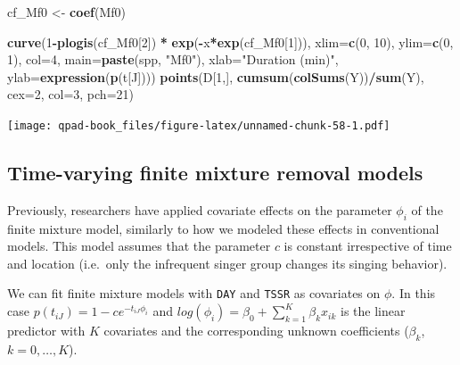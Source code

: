\documentclass[12pt,]{book}
\newenvironment{Shaded}{\begin{snugshade}}{\end{snugshade}}
\newcommand{\DataTypeTok}[1]{\textcolor[rgb]{0.13,0.29,0.53}{#1}}
\newcommand{\DecValTok}[1]{\textcolor[rgb]{0.00,0.00,0.81}{#1}}
\newcommand{\KeywordTok}[1]{\textcolor[rgb]{0.13,0.29,0.53}{\textbf{#1}}}
\newcommand{\NormalTok}[1]{#1}
\newcommand{\OperatorTok}[1]{\textcolor[rgb]{0.81,0.36,0.00}{\textbf{#1}}}
\newcommand{\StringTok}[1]{\textcolor[rgb]{0.31,0.60,0.02}{#1}}
\begin{document}
\begin{Shaded}
\begin{Highlighting}[]
\NormalTok{cf_Mf0 <-}\StringTok{ }\KeywordTok{coef}\NormalTok{(Mf0)}

\KeywordTok{curve}\NormalTok{(}\DecValTok{1}\OperatorTok{-}\KeywordTok{plogis}\NormalTok{(cf_Mf0[}\DecValTok{2}\NormalTok{]) }\OperatorTok{*}\StringTok{ }\KeywordTok{exp}\NormalTok{(}\OperatorTok{-}\NormalTok{x}\OperatorTok{*}\KeywordTok{exp}\NormalTok{(cf_Mf0[}\DecValTok{1}\NormalTok{])), }
  \DataTypeTok{xlim=}\KeywordTok{c}\NormalTok{(}\DecValTok{0}\NormalTok{, }\DecValTok{10}\NormalTok{), }\DataTypeTok{ylim=}\KeywordTok{c}\NormalTok{(}\DecValTok{0}\NormalTok{, }\DecValTok{1}\NormalTok{), }\DataTypeTok{col=}\DecValTok{4}\NormalTok{, }\DataTypeTok{main=}\KeywordTok{paste}\NormalTok{(spp, }\StringTok{"Mf0"}\NormalTok{),}
  \DataTypeTok{xlab=}\StringTok{"Duration (min)"}\NormalTok{, }\DataTypeTok{ylab=}\KeywordTok{expression}\NormalTok{(}\KeywordTok{p}\NormalTok{(t[J])))}
\KeywordTok{points}\NormalTok{(D[}\DecValTok{1}\NormalTok{,], }\KeywordTok{cumsum}\NormalTok{(}\KeywordTok{colSums}\NormalTok{(Y))}\OperatorTok{/}\KeywordTok{sum}\NormalTok{(Y), }\DataTypeTok{cex=}\DecValTok{2}\NormalTok{, }\DataTypeTok{col=}\DecValTok{3}\NormalTok{, }\DataTypeTok{pch=}\DecValTok{21}\NormalTok{)}
\end{Highlighting}
\end{Shaded}

\texttt{[image: qpad-book\_files/figure-latex/unnamed-chunk-58-1.pdf]}

\hypertarget{time-varying-finite-mixture-removal-models}{%
\subsection{Time-varying finite mixture removal models}\label{time-varying-finite-mixture-removal-models}}

Previously, researchers have applied covariate effects on the parameter
\(\phi_{i}\) of the finite mixture model, similarly to how we modeled these effects in conventional models.
This model assumes that the parameter \(c\) is constant irrespective of time and location
(i.e.~only the infrequent singer group changes its singing behavior).

We can fit finite mixture models with \texttt{DAY} and \texttt{TSSR} as covariates on \(\phi\).
In this case \(p(t_{iJ}) = 1 - c e^{-t_{iJ} \phi_{i}}\) and
\(log(\phi_{i}) = \beta_{0} + \sum^{K}_{k=1} \beta_{k} x_{ik}\)
is the linear predictor with \(K\) covariates and the corresponding unknown coefficients
(\(\beta_{k}\), \(k = 0,\ldots, K\)).
\end{document}
